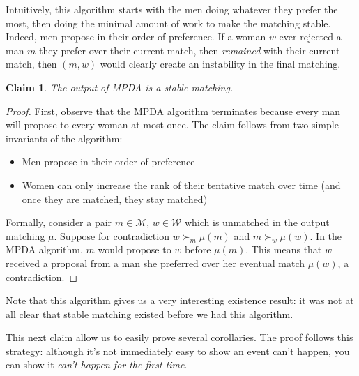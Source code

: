\documentclass[12pt]{article}
\newcommand{\M}{\mathcal{M}}
\newcommand{\W}{\mathcal{W}}
\newtheorem{claim}[definition]{Claim}
\begin{document}
  Intuitively, this algorithm starts with the men doing whatever they prefer
  the most, then doing the minimal amount of work to make the matching stable.
  Indeed, men propose in their order of preference. If a woman $w$ ever
  rejected a man $m$ they prefer over their current match,
  then \emph{remained} with their current match,
  then $(m,w)$ would clearly create an instability in the final matching.

  \begin{claim}
    The output of MPDA is a stable matching.
  \end{claim}
  \begin{proof}
    First, observe that the MPDA algorithm terminates
    because every man will propose to every woman at most once.
    The claim follows from two simple invariants of the algorithm:
    \begin{itemize}
      \item Men propose in their order of preference
      \item Women can only increase the rank of their tentative match over time
        (and once they are matched, they stay matched)
    \end{itemize}
    Formally, consider a pair $m\in \M$, $w\in \W$ which
    is unmatched in the output matching
    $\mu$. Suppose for contradiction $w\succ_m \mu(m)$ and $m\succ_w \mu(w)$.
    In the MPDA algorithm, $m$ would propose to $w$ before $\mu(m)$.
    This means that $w$ received a proposal from a man she preferred over her
    eventual match $\mu(w)$, a contradiction.
  \end{proof}

  Note that this algorithm gives us a very interesting existence result: it was
  not at all clear that stable matching existed before we had this algorithm.

  This next claim allow us to easily prove several corollaries.
  The proof follows this strategy: although it's not immediately easy to show an
  event can't happen, you can show it \emph{can't happen for the first time}.
\end{document}
